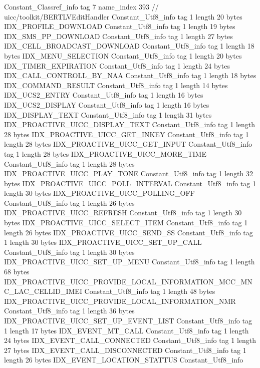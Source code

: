 {{{		}
		Constant_Classref_info {
			tag	7
			name_index	393		// uicc/toolkit/BERTLVEditHandler
		}
		Constant_Utf8_info {
			tag	1
			length	20
			bytes	IDX_PROFILE_DOWNLOAD
		}
		Constant_Utf8_info {
			tag	1
			length	19
			bytes	IDX_SMS_PP_DOWNLOAD
		}
		Constant_Utf8_info {
			tag	1
			length	27
			bytes	IDX_CELL_BROADCAST_DOWNLOAD
		}
		Constant_Utf8_info {
			tag	1
			length	18
			bytes	IDX_MENU_SELECTION
		}
		Constant_Utf8_info {
			tag	1
			length	20
			bytes	IDX_TIMER_EXPIRATION
		}
		Constant_Utf8_info {
			tag	1
			length	24
			bytes	IDX_CALL_CONTROLL_BY_NAA
		}
		Constant_Utf8_info {
			tag	1
			length	18
			bytes	IDX_COMMAND_RESULT
		}
		Constant_Utf8_info {
			tag	1
			length	14
			bytes	IDX_UCS2_ENTRY
		}
		Constant_Utf8_info {
			tag	1
			length	16
			bytes	IDX_UCS2_DISPLAY
		}
		Constant_Utf8_info {
			tag	1
			length	16
			bytes	IDX_DISPLAY_TEXT
		}
		Constant_Utf8_info {
			tag	1
			length	31
			bytes	IDX_PROACTIVE_UICC_DISPLAY_TEXT
		}
		Constant_Utf8_info {
			tag	1
			length	28
			bytes	IDX_PROACTIVE_UICC_GET_INKEY
		}
		Constant_Utf8_info {
			tag	1
			length	28
			bytes	IDX_PROACTIVE_UICC_GET_INPUT
		}
		Constant_Utf8_info {
			tag	1
			length	28
			bytes	IDX_PROACTIVE_UICC_MORE_TIME
		}
		Constant_Utf8_info {
			tag	1
			length	28
			bytes	IDX_PROACTIVE_UICC_PLAY_TONE
		}
		Constant_Utf8_info {
			tag	1
			length	32
			bytes	IDX_PROACTIVE_UICC_POLL_INTERVAL
		}
		Constant_Utf8_info {
			tag	1
			length	30
			bytes	IDX_PROACTIVE_UICC_POLLING_OFF
		}
		Constant_Utf8_info {
			tag	1
			length	26
			bytes	IDX_PROACTIVE_UICC_REFRESH
		}
		Constant_Utf8_info {
			tag	1
			length	30
			bytes	IDX_PROACTIVE_UICC_SELECT_ITEM
		}
		Constant_Utf8_info {
			tag	1
			length	26
			bytes	IDX_PROACTIVE_UICC_SEND_SS
		}
		Constant_Utf8_info {
			tag	1
			length	30
			bytes	IDX_PROACTIVE_UICC_SET_UP_CALL
		}
		Constant_Utf8_info {
			tag	1
			length	30
			bytes	IDX_PROACTIVE_UICC_SET_UP_MENU
		}
		Constant_Utf8_info {
			tag	1
			length	68
			bytes	IDX_PROACTIVE_UICC_PROVIDE_LOCAL_INFORMATION_MCC_MNC_LAC_CELLID_IMEI
		}
		Constant_Utf8_info {
			tag	1
			length	48
			bytes	IDX_PROACTIVE_UICC_PROVIDE_LOCAL_INFORMATION_NMR
		}
		Constant_Utf8_info {
			tag	1
			length	36
			bytes	IDX_PROACTIVE_UICC_SET_UP_EVENT_LIST
		}
		Constant_Utf8_info {
			tag	1
			length	17
			bytes	IDX_EVENT_MT_CALL
		}
		Constant_Utf8_info {
			tag	1
			length	24
			bytes	IDX_EVENT_CALL_CONNECTED
		}
		Constant_Utf8_info {
			tag	1
			length	27
			bytes	IDX_EVENT_CALL_DISCONNECTED
		}
		Constant_Utf8_info {
			tag	1
			length	26
			bytes	IDX_EVENT_LOCATION_STATTUS
		}
		Constant_Utf8_info {
}}}
